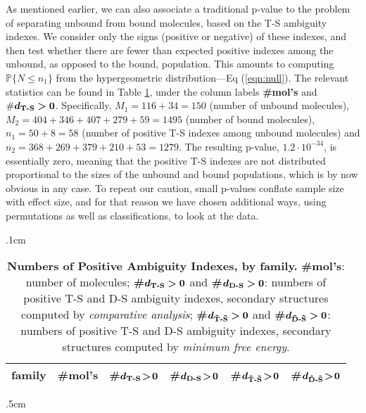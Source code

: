 \documentclass[10pt,letterpaper]{article}
\begin{document}
As mentioned earlier, we can also associate a traditional p-value to the problem of separating unbound from bound molecules, based on the T-S ambiguity indexes. We consider only the signs (positive or negative) of these indexes, and then test whether there are fewer than expected positive indexes among the unbound, as opposed to the bound, population. This amounts to computing $\mathbb{P}\{N\leq n_1\}$ from the hypergeometric distribution---Eq (\ref{eqn:null}). The relevant statistics can be found in Table \ref{table:NumberPositive}, 
under the column labels {\bf \#mol's} and $\bm{\#d_\text{\bf T-S}>0}$. Specifically, 
$M_1=116+34=150$ (number of unbound molecules),
$M_2=404+346+407+279+59=1495$ (number of bound molecules), $n_1=50+8=58$ (number of positive T-S indexes among unbound molecules) and $n_2=368+269+379+210+53=1279$.
The resulting p-value, $1.2\cdot 10^{-34}$, is essentially zero, meaning that the positive T-S indexes are not distributed proportional to the sizes of the unbound and bound populations, which is by now obvious in any case. To repeat our caution, small p-values conflate sample size with effect size, and for that reason we have chosen additional ways, using permutations as well as classifications, to look at the data.

\vglue .1cm
\begin{table}[h!]
\begin{center}
\begin{tabular}{ l || r | r | r | r | r}
\hglue 5mm 
{\bf family} & {\bf \#mol's} & {\bf\#}$\bm{d_\text{\bf T-S}\!>\!0}$ &
{\bf\#}$\bm{d_\text{\bf D-S}\!>\!0}$ & {\bf\#}$\bm{d_\text{\bf \~T-\~S}\!>\!0}$ & {\bf\#}$\bm{d_\text{\bf \~D-\~S}\!>\!0}$ \\ \hline \hline

\end{tabular}
\vglue .5cm
\caption{\footnotesize {\bf Numbers of Positive Ambiguity Indexes, by family.} 
{\bf \#mol's}: number of molecules; {\bf\#}$\bm{d_\text{\bf T-S}>0}$ and 
 {\bf\#}$\bm{d_\text{\bf D-S}>0}$: numbers of positive T-S and D-S ambiguity indexes, secondary structures computed by {\em comparative analysis}; 
 {\bf\#}$\bm{d_\text{\bf \~T-\~S}>0}$ and {\bf\#}$\bm{d_\text{\bf \~D-\~S}>0}$: numbers of positive T-S and D-S ambiguity indexes, secondary structures computed by {\em minimum free energy}.
} 
\label{table:NumberPositive}
\end{center}
\end{table}
\end{document}
